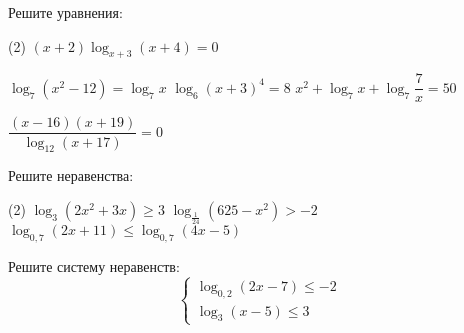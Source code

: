\begin{consultation}
	\begin{listofex}
		\item Решите уравнения: %
		\begin{tasks}(2)
			\task \( (x+2)\log_{x+3}(x+4)=0 \)
			
			
			\task \( \log_7 (x^2-12)=\log_7 x \)
			\task \( \log_6 (x+3)^4=8 \)
			\task \( x^2+\log_7x+\log_7 \dfrac{ 7 }{  x}=50 \)
			
			\task \( \dfrac{ (x-16)(x+19) }{ \log_{12}(x+17) }=0 \)
		\end{tasks}
		\item Решите неравенства: %
		\begin{tasks}(2)
			\task \( \log_3(2x^2+3x) \ge 3 \)
			\task \( \log_{\tfrac{1}{24}}(625-x^2)>-2 \)
			\task \( \log_{0,7}(2x+11)\le \log_{0,7}(4x-5) \)
		\end{tasks}
		\item Решите систему неравенств: %
			\[ \begin{cases} \log_{0,2}(2x-7) \le -2 \\ \log_3 (x-5) \le 3 \end{cases} \]
	\end{listofex}
\end{consultation}

